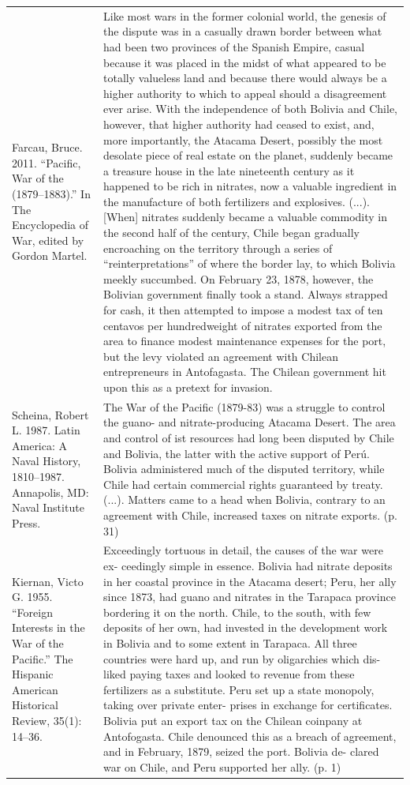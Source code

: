{\begin{longtable}{p{}p{}}
\\
Farcau, Bruce. 2011. “Pacific, War of the (1879–1883).” In The Encyclopedia of War, edited by Gordon Martel. & Like most wars in the former colonial world, the genesis of the dispute was in a casually drawn border between what had been two provinces of the Spanish Empire, casual because it was placed in the midst of what appeared to be totally valueless land and because there would always be a higher authority to which to appeal should a disagreement ever arise. With the independence of both Bolivia and Chile, however, that higher authority had ceased to exist, and, more importantly, the Atacama Desert, possibly the most desolate piece of real estate on the planet, suddenly became a treasure house in the late nineteenth century as it happened to be rich in nitrates, now a valuable ingredient in the manufacture of both fertilizers and explosives. (...). 
[When] nitrates suddenly became a valuable commodity in the second half of the century, Chile began gradually encroaching on the territory through a series of “reinterpretations” of where the border lay, to which Bolivia meekly succumbed. On February 23, 1878, however, the Bolivian government finally took a stand. Always strapped for cash, it then attempted to impose a modest tax of ten centavos per hundredweight of nitrates exported from the area to finance modest maintenance expenses for the port, but the levy violated an agreement with Chilean entrepreneurs in Antofagasta. The Chilean government hit upon this as a pretext for invasion.
\\
Scheina, Robert L. 1987. Latin America: A Naval History, 1810–1987. Annapolis, MD: Naval Institute Press. & The War of the Pacific (1879-83) was a struggle to control the guano- and nitrate-producing Atacama Desert. The area and control of ist resources had long been disputed by Chile and Bolivia, the latter with the active support of Perú. Bolivia administered much of the disputed territory, while Chile had certain commercial rights guaranteed by treaty. (...). Matters came to a head when Bolivia, contrary to an agreement with Chile, increased taxes on nitrate exports. (p. 31)
\\
Kiernan, Victo G. 1955. “Foreign Interests in the War of the Pacific.” The Hispanic American Historical Review, 35(1): 14–36. & Exceedingly tortuous in detail, the causes of the war were ex- ceedingly simple in essence. Bolivia had nitrate deposits in her coastal province in the Atacama desert; Peru, her ally since 1873, had guano and nitrates in the Tarapaca province bordering it on the north. Chile, to the south, with few deposits of her own, had invested in the development work in Bolivia and to some extent in Tarapaca. All three countries were hard up, and run by oligarchies which dis- liked paying taxes and looked to revenue from these fertilizers as a substitute. Peru set up a state monopoly, taking over private enter- prises in exchange for certificates. Bolivia put an export tax on the Chilean coinpany at Antofogasta. Chile denounced this as a breach of agreement, and in February, 1879, seized the port. Bolivia de- clared war on Chile, and Peru supported her ally. (p. 1)
\\
\end{longtable}}

